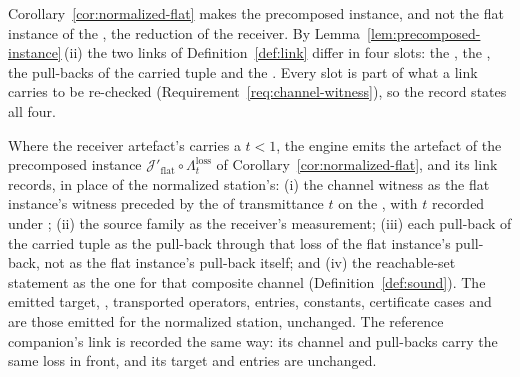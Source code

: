 
Corollary~\ref{cor:normalized-flat} makes the precomposed instance, and not
the flat instance of the , the reduction of the receiver.
By Lemma~\ref{lem:precomposed-instance}\,(ii) the two links of
Definition~\ref{def:link} differ in four slots: the ,
the , the pull-backs of the carried tuple and the
. Every slot is part of what a link carries to
be re-checked (Requirement~\ref{req:channel-witness}), so the record states
all four.

\begin{requirement}\label{req:normalized-link-record}
Where the receiver artefact's  carries a
 $t<1$, the engine emits the artefact of the precomposed
instance $\mathcal{J}'_{\mathrm{flat}}\circ\Lambda^{\mathrm{loss}}_t$ of
Corollary~\ref{cor:normalized-flat}, and its link records, in place of the
normalized station's: (i) the channel witness as the flat instance's witness
preceded by the  of transmittance $t$ on the
, with $t$ recorded under ; (ii) the
source family as the receiver's measurement; (iii) each pull-back of the
carried tuple as the pull-back through that loss of the flat instance's
pull-back, not as the flat instance's pull-back itself; and (iv) the
reachable-set statement as the one for that composite channel
(Definition~\ref{def:sound}). The emitted target, ,
transported operators, entries, constants, certificate cases and
 are those emitted for the normalized station, unchanged. The reference
companion's link is recorded the same way: its channel and pull-backs carry
the same loss in front, and its target and entries are unchanged.
\end{requirement}
